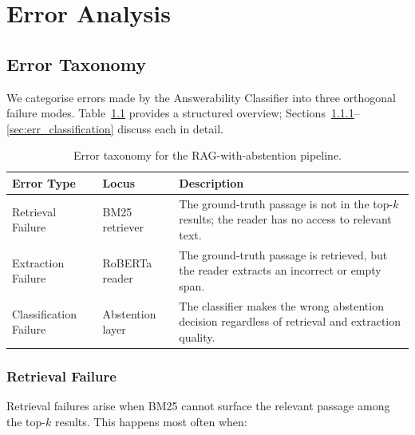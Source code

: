 \chapter{Error Analysis}
\label{chap:error_analysis}

\section{Error Taxonomy}
\label{sec:err_taxonomy}

We categorise errors made by the Answerability Classifier into three
orthogonal failure modes. Table~\ref{tab:error_taxonomy} provides a structured
overview; Sections~\ref{sec:err_retrieval}–\ref{sec:err_classification} discuss
each in detail.

\begin{table}[htbp]
  \centering
  \caption{Error taxonomy for the RAG-with-abstention pipeline.}
  \label{tab:error_taxonomy}
  \begin{tabular}{llp{6.5cm}}
    \toprule
    \textbf{Error Type} & \textbf{Locus} & \textbf{Description} \\
    \midrule
    Retrieval Failure      & BM25 retriever  & The ground-truth passage is not in
                                               the top-$k$ results; the reader
                                               has no access to relevant text. \\
    Extraction Failure     & RoBERTa reader  & The ground-truth passage is retrieved,
                                               but the reader extracts an incorrect
                                               or empty span. \\
    Classification Failure & Abstention layer & The classifier makes the wrong
                                               abstention decision regardless of
                                               retrieval and extraction quality. \\
    \bottomrule
  \end{tabular}
\end{table}

\subsection{Retrieval Failure}
\label{sec:err_retrieval}

Retrieval failures arise when BM25 cannot surface the relevant passage among the
top-$k$ results. This happens most often when:

